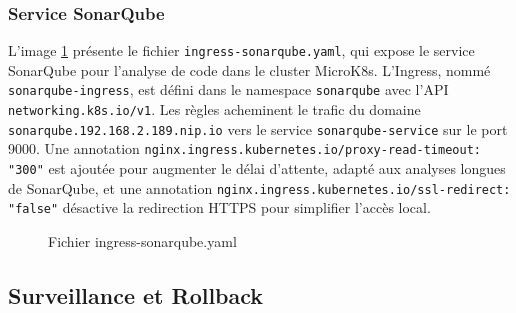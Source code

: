 \subsubsection{Service SonarQube}
L'image \ref{fig:sonaing} présente le fichier \texttt{ingress-sonarqube.yaml}, qui expose le service SonarQube pour l’analyse de code dans le cluster MicroK8s. L’Ingress, nommé \texttt{sonarqube-ingress}, est défini dans le namespace \texttt{sonarqube} avec l’API \texttt{networking.k8s.io/v1}. Les règles acheminent le trafic du domaine \texttt{sonarqube.192.168.2.189.nip.io} vers le service \texttt{sonarqube-service} sur le port 9000. Une annotation \texttt{nginx.ingress.kubernetes.io/proxy-read-timeout: "300"} est ajoutée pour augmenter le délai d’attente, adapté aux analyses longues de SonarQube, et une annotation \texttt{nginx.ingress.kubernetes.io/ssl-redirect: "false"} désactive la redirection HTTPS pour simplifier l’accès local.
\begin{figure}[h]
    \begin{adjustwidth}{-3.5cm}{-3.5cm}
    \centering
    \caption{Fichier ingress-sonarqube.yaml}
    \label{fig:sonaing}
    \end{adjustwidth}
\end{figure}
\newpage
\subsection{Surveillance et Rollback}
